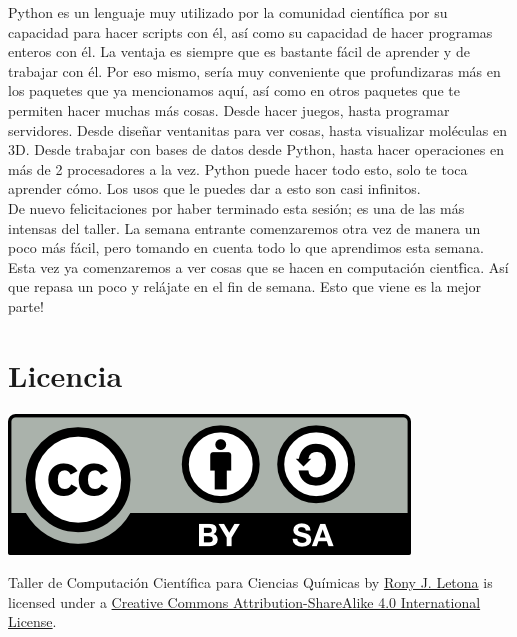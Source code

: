 \documentclass[10pt,letterpaper]{article}
\begin{document}
Python es un lenguaje muy utilizado por la comunidad cient\'ifica por su capacidad para hacer scripts con \'el, as\'i como su capacidad de hacer programas enteros con \'el. La ventaja es siempre que es bastante f\'acil de aprender y de trabajar con \'el. Por eso mismo, ser\'ia muy conveniente que profundizaras m\'as en los paquetes que ya mencionamos aqu\'i, as\'i como en otros paquetes que te permiten hacer muchas m\'as cosas. Desde hacer juegos, hasta programar servidores. Desde dise\~nar ventanitas para ver cosas, hasta visualizar mol\'eculas en 3D. Desde trabajar con bases de datos desde Python, hasta hacer operaciones en m\'as de 2 procesadores a la vez. Python puede hacer todo esto, solo te toca aprender c\'omo. Los usos que le puedes dar a esto son casi infinitos.\\

De nuevo felicitaciones por haber terminado esta sesi\'on; es una de las m\'as intensas del taller. La semana entrante comenzaremos otra vez de manera un poco m\'as f\'acil, pero tomando en cuenta todo lo que aprendimos esta semana. Esta vez ya comenzaremos a ver cosas que se hacen en computaci\'on cient\'fica. As\'i que repasa un poco y rel\'ajate en el fin de semana. Esto que viene es la mejor parte!

\section*{Licencia}

\noindent \includegraphics{img/cc_big.png}

\noindent Taller de Computaci\'on Cient\'ifica para Ciencias Qu\'imicas by \href{http://github.com/zronyj/TQCA}{Rony J. Letona} is licensed under a \href{http://creativecommons.org/licenses/by-sa/4.0/}{Creative Commons Attribution-ShareAlike 4.0 International License}.
\end{document}
